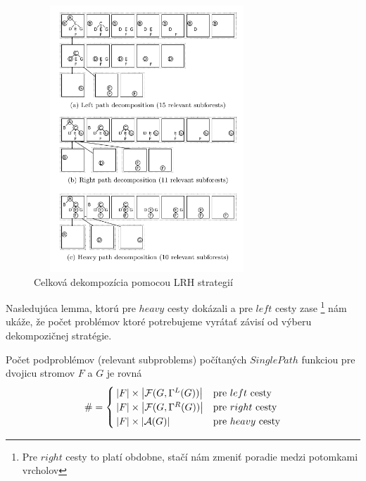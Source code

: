 \begin{figure}
\centering
\includegraphics[width=85mm, height=100mm]{../img/LRH_decomposition.png}
\caption{Celková dekompozícia pomocou LRH strategií }
\label{obr:LRH_decomposition}
\end{figure}

Nasledujúca lemma, ktorú pre $heavy$ cesty dokázali \citet{DMRW}
a pre $left$ cesty zase \citet{ZHANGSHASHA}
\footnote{Pre $right$ cesty to platí obdobne, stačí nám zmeniť poradie medzi potomkami vrcholov}
nám ukáže, že počet problémov ktoré potrebujeme vyrátať závisí od výberu dekompozičnej stratégie.

\begin{lemma}
  Počet podproblémov (relevant subproblems) počítaných $SinglePath$ funkciou pre dvojicu
  stromov $F$ a $G$ je rovná
  \begin{align*}
    \# = 
    \begin{cases}
      \left|{F}\right| \times \left|{\mathcal{F}(G, \Gamma^{L}(G))}\right| & \text{pre $left$ cesty}
      \\
      \left|{F}\right| \times \left|{\mathcal{F}(G, \Gamma^{R}(G))}\right| & \text{pre $right$ cesty}
      \\
      \left|{F}\right| \times \left|{\mathcal{A}(G)}\right| & \text{pre $heavy$ cesty}
    \end{cases}
  \end{align*}
\end{lemma}

